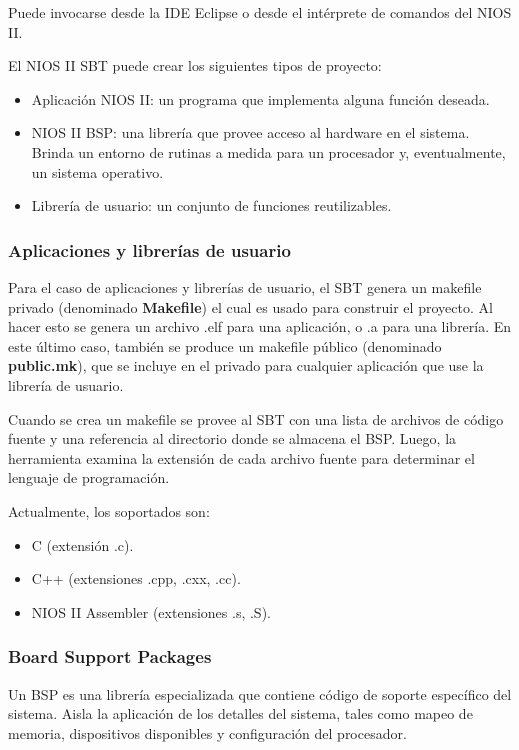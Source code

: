 Puede invocarse desde la IDE Eclipse o desde el intérprete de comandos del NIOS II.

El NIOS II SBT puede crear los siguientes tipos de proyecto:
\begin{itemize}
	\item Aplicación NIOS II: un programa que implementa alguna función deseada.
	\item NIOS II BSP: una librería que provee acceso al hardware en el sistema. Brinda un entorno de rutinas a medida para un procesador y, eventualmente, un sistema operativo. 
	\item Librería de usuario: un conjunto de funciones reutilizables. 
\end{itemize}

\subsubsection{Aplicaciones y librerías de usuario}

Para el caso de aplicaciones y librerías de usuario, el SBT genera un makefile privado (denominado \textbf{Makefile}) el cual es usado para construir el proyecto. Al hacer esto se genera un archivo .elf para una aplicación, o .a para una librería. En este último caso, también se produce un makefile público (denominado \textbf{public.mk}), que se incluye en el privado para cualquier aplicación que use la librería de usuario.

Cuando se crea un makefile se provee al SBT con una lista de archivos de código fuente y una referencia al directorio donde se almacena el BSP. Luego, la herramienta examina la extensión de cada archivo fuente para determinar el lenguaje de programación. 

Actualmente, los soportados son:

\begin{itemize}
	\item C (extensión .c).
	\item C++ (extensiones .cpp, .cxx, .cc).
	\item NIOS II Assembler (extensiones .s, .S).
\end{itemize}


\subsubsection{Board Support Packages}

Un BSP es una librería especializada que contiene código de soporte específico del sistema. Aisla la aplicación de los detalles del sistema, tales como mapeo de memoria, dispositivos disponibles y configuración del procesador.

